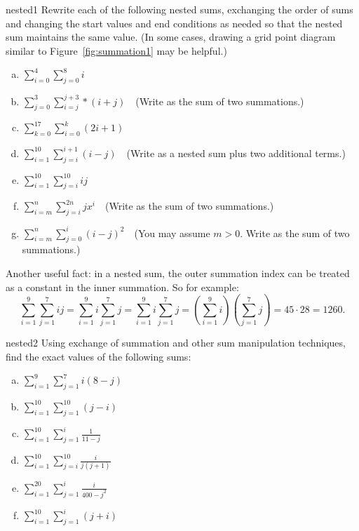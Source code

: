 \begin{exercise}{nested1}
Rewrite each of the following nested sums, exchanging the order of sums and changing the start values and end conditions as needed so that the nested sum maintains the same value. (In some cases, drawing a grid point diagram similar to Figure~\ref{fig:summation1} may be helpful.)
\begin{enumerate}[(a)]
\item
$\displaystyle{\sum_{i=0}^{4}\sum_{j=0}^{8}i}$
\item
$\displaystyle{\sum_{j=0}^{3} \sum_{i=j}^{j+3}*(i+j)}$~~(Write as the sum of two summations.)
\item
$\displaystyle{\sum_{k=0}^{17}\sum_{i=0}^{k}(2i+1) }$
\item
$\displaystyle{\sum_{i=1}^{10}\sum_{j=i}^{i+1} (i-j) }$~~(Write as a nested sum plus two additional terms.)
\item
$\displaystyle{\sum_{i=1}^{10}\sum_{j=i}^{10} ij }$
\item
$\displaystyle{\sum_{i=m}^{n}\sum_{j=i}^{2n}jx^i }$~~(Write as the sum of two summations.)
\item
$\displaystyle{\sum_{i=m}^{n}\sum_{j=0}^{i}(i-j)^2 }$~~(You may assume $m>0$.  Write as the sum of two summations.)
\end {enumerate}
\end{exercise}
Another useful fact: in a nested sum, the outer summation index can be treated as a constant in the inner summation.  So for example:
\[ \sum_{i=1}^{9} \sum_{j=1}^7 ij = \sum_{i=1}^{9} i \sum_{j=1}^7 j = \sum_{i=1}^{9} i\sum_{j=1}^7 j = \left(\sum_{i=1}^{9} i\right) \left(\sum_{j=1}^7 j\right) = 45\cdot 28=1260. \]
\begin{exercise}{nested2}
Using exchange of summation and other sum manipulation techniques, find the exact values of the following sums:


\begin{multicols}{2}
\begin{enumerate}[(a)]
\item
$\displaystyle{\sum_{i=1}^{9} \sum_{j=1}^{7} i(8-j)}$
\item
$\displaystyle{\sum_{i=1}^{10} \sum_{j=1}^{10} (j-i)}$
\item
$\displaystyle{\sum_{i=1}^{10} \sum_{j=1}^i \frac{1}{11-j}}$
\item
$\displaystyle{\sum_{i=1}^{10} \sum_{j=i}^{10} \frac{i}{j(j+1)}}$
\item
$\displaystyle{\sum_{i=1}^{20} \sum_{j=1}^i \frac{i}{400-j^2}}$
\item
$\displaystyle{\sum_{i=1}^{10} \sum_{j=1}^i (j+i)}$
\end{enumerate}
\end{multicols}
\end{exercise}

